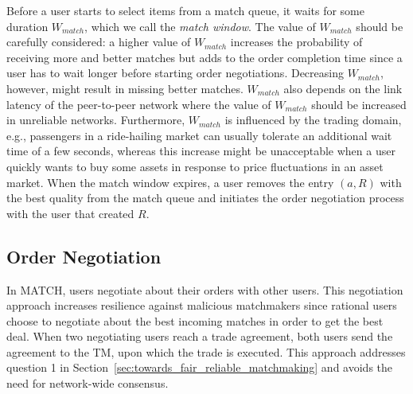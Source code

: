 Before a user starts to select items from a match queue, it waits for some duration $ W_{match} $, which we call the \emph{match window}.
The value of $ W_{match} $ should be carefully considered: a higher value of $ W_{match} $ increases the probability of receiving more and better matches but adds to the order completion time since a user has to wait longer before starting order negotiations.
Decreasing $ W_{match} $, however, might result in missing better matches.
$ W_{match} $ also depends on the link latency of the peer-to-peer network where the value of $ W_{match} $ should be increased in unreliable networks.
Furthermore, $ W_{match} $ is influenced by the trading domain, e.g., passengers in a ride-hailing market can usually tolerate an additional wait time of a few seconds, whereas this increase might be unacceptable when a user quickly wants to buy some assets in response to price fluctuations in an asset market.
When the match window expires, a user removes the entry $ (a, R) $ with the best quality from the match queue and initiates the order negotiation process with the user that created $ R $.

\subsection{Order Negotiation}
\label{sec:order_negotiation}

In MATCH, users negotiate about their orders with other users.
This negotiation approach increases resilience against malicious matchmakers since rational users choose to negotiate about the best incoming matches in order to get the best deal.
When two negotiating users reach a trade agreement, both users send the agreement to the TM, upon which the trade is executed.
This approach addresses question 1 in Section~\ref{sec:towards_fair_reliable_matchmaking} and avoids the need for network-wide consensus.

